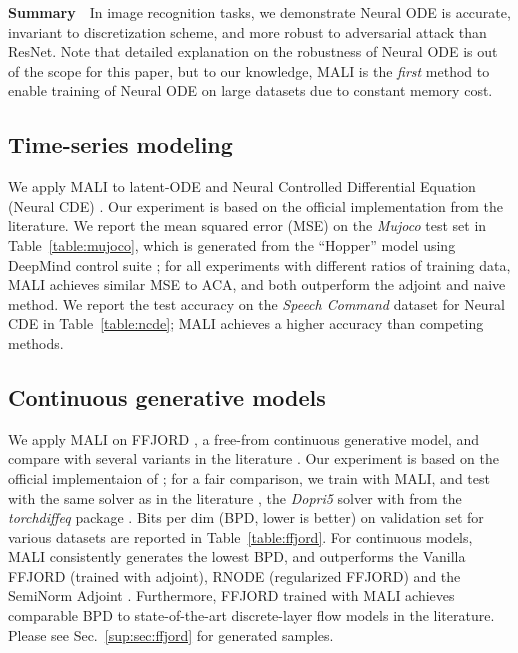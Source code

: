 \documentclass{article} \usepackage{iclr2021_conference,times}
\begin{document}
\textbf{Summary}\ \  In image recognition tasks, we demonstrate Neural ODE is accurate, invariant to discretization scheme, and more robust to adversarial attack than ResNet. Note that detailed explanation on the robustness of Neural ODE is out of the scope for this paper, but to our knowledge, MALI is the \textit{first} method to enable training of Neural ODE on large datasets due to constant memory cost.
\vspace{-1mm}
\subsection{Time-series modeling}
\vspace{-1mm}
We apply MALI to latent-ODE \citep{rubanova2019latent} and Neural Controlled Differential Equation (Neural CDE) \citep{kidger2020hey, kidger2020neural}. Our experiment is based on the official implementation from the literature. 
We report the mean squared error (MSE) on the \textit{Mujoco} test set in Table~\ref{table:mujoco}, which is generated from the ``Hopper'' model using DeepMind control suite \citep{tassa2018deepmind}; for all experiments with different ratios of training data, MALI achieves similar MSE to ACA, and both outperform the adjoint and naive method. We report the test accuracy on the \textit{Speech Command} dataset for Neural CDE in Table~\ref{table:ncde}; MALI achieves a higher accuracy than competing methods.
\vspace{-1mm}
\subsection{Continuous generative models} 
\vspace{-1mm}
We apply MALI on FFJORD \citep{grathwohl2018ffjord}, a free-from continuous generative model, and compare with several variants in the literature \citep{finlay2020train, kidger2020hey}. Our experiment is based on the official implementaion of \cite{finlay2020train}; for a fair comparison, we train with MALI, and test with the same solver as in the literature \citep{grathwohl2018ffjord, finlay2020train}, the \textit{Dopri5} solver with  from the \textit{torchdiffeq} package \citep{chen2018neural}. Bits per dim (BPD, lower is better) on validation set for various datasets are reported in Table~\ref{table:ffjord}. For continuous models, MALI consistently generates the lowest BPD, and outperforms the Vanilla FFJORD (trained with adjoint), RNODE (regularized FFJORD) and the SemiNorm Adjoint \citep{kidger2020hey}. Furthermore, FFJORD trained with MALI achieves comparable BPD to state-of-the-art discrete-layer flow models in the literature. Please see Sec.~\ref{sup:sec:ffjord} for generated samples.
\vspace{-4mm}
\end{document}
